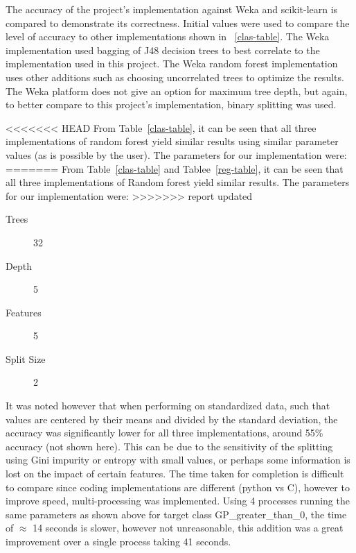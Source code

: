 \documentclass{article} %
\begin{document}
The accuracy of the project’s implementation against Weka and scikit-learn is compared to demonstrate
its correctness.  Initial values were used to compare the level of accuracy to other implementations shown in ~\ref{clas-table}. The Weka implementation used bagging of J48 decision trees to best correlate to the implementation used in this project. The Weka random forest implementation uses other additions such as choosing uncorrelated trees to optimize the results. The Weka platform does not give an option for maximum tree depth, but again, to better compare to this project's implementation, binary splitting was used.

<<<<<<< HEAD
From Table~\ref{clas-table}, it can be seen that all three implementations of random forest yield similar results using similar parameter values (as is possible by the user). The parameters for our implementation were:
=======
From Table~\ref{clas-table} and Tablee~\ref{reg-table}, it can be seen that all three implementations of Random forest yield similar results. The parameters for our implementation were:
>>>>>>> report updated
\begin{description}
\item [Trees] 32
\item [Depth] 5
\item [Features] 5
\item [Split Size] 2
\end{description}

It was noted however that when performing on standardized data, such that values are centered by their means and divided by the standard deviation, the accuracy was significantly lower for all three implementations, around 55\% accuracy (not shown here). This can be due to the sensitivity of the splitting using Gini impurity or entropy with small values, or perhaps some information is lost on the impact of certain features. The time taken for completion is difficult to compare since coding implementations are different (python vs C), however to improve speed, multi-processing was implemented. Using 4 processes running the same parameters as shown above for target class GP\_greater\_than\_0, the time of $\approx$ 14 seconds is slower, however not unreasonable, this addition was a great improvement over a single process taking 41 seconds.
\end{document}
